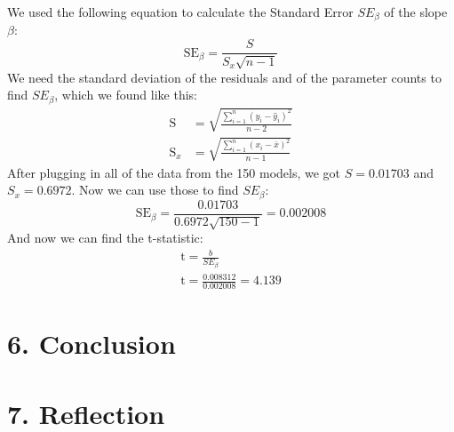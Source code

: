 \documentclass[12pt]{article}
\begin{document}
    We used the following equation to calculate the Standard Error $SE_\beta$ of the slope $\beta$:
    \[
        \mathrm{SE}_{\beta}
        =
        \frac{
            \displaystyle S
        }{
            \displaystyle S_x \sqrt{n - 1}
        }
    \]
    \noindent We need the standard deviation of the residuals and of the parameter counts to find $SE_\beta$, which we found like this:
    \begin{align*}
        \mathrm{S} &=
        \sqrt{
            \frac{
                \sum_{i=1}^n (y_i - \hat{y}_i)^2
            }{
                n - 2
            }
        } \\[1em]
        \mathrm{S}_x &=
        \sqrt{
            \frac{
                \sum_{i=1}^n (x_i - \bar{x})^2
            }{
                n - 1
            }
        }
    \end{align*}
    \noindent After plugging in all of the data from the 150 models, we got $S = 0.01703$ and $S_x = 0.6972$.
    Now we can use those to find $SE_\beta$:
    \[
        \mathrm{SE}_{\beta}
        =
        \frac{
            \displaystyle 0.01703
        }{
            \displaystyle 0.6972 \sqrt{150 - 1}
        }
        =
        0.002008
    \]
    \noindent And now we can find the t-statistic:
    \begin{gather*}
        \mathrm{t} = \frac{b}{SE_\beta} \\[1em]
        \mathrm{t} = \frac{0.008312}{0.002008} = 4.139
    \end{gather*}

    \section*{6. Conclusion}

    \section*{7. Reflection}
\end{document}
